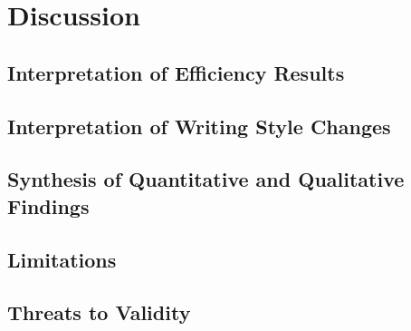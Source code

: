 \chapter{Discussion}
\label{ch:discussion}


\section{Interpretation of Efficiency Results}

\section{Interpretation of Writing Style Changes}

\section{Synthesis of Quantitative and Qualitative Findings}

\section{Limitations}

\section{Threats to Validity}